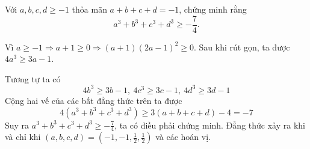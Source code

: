 \begin{problem}
	Với $a, b, c, d \ge -1$ thỏa mãn $a + b + c + d = -1$, chứng minh rằng
	$$
		a^3 + b^3 + c^3 + d^3 \ge -\frac{7}{4}.
	$$
	\solution

	Vì $a \ge -1 \Rightarrow a + 1 \ge 0 \Rightarrow (a + 1)(2a - 1)^2 \ge 0$. Sau khi rút gọn, ta được
	$4a^3 \ge 3a - 1$.

	Tương tự ta có 
	$$
		4b^3 \ge 3b - 1,\ 4c^3 \ge 3c - 1,\ 4d^3 \ge 3d - 1
	$$
	Cộng hai vế của các bất đẳng thức trên ta được
	$$
		4(a^3 + b^3 + c^3 + d^3) \ge 3(a + b + c + d) - 4 = -7
	$$
	Suy ra $\displaystyle a^3 + b^3 + c^3 + d^3 \ge -\frac{7}{4}$, ta có điều phải chứng minh. Đẳng thức xảy ra khi và chỉ khi $\displaystyle (a, b, c, d) = (-1, -1, \frac{1}{2}, \frac{1}{2})$ và các hoán vị.
\end{problem}